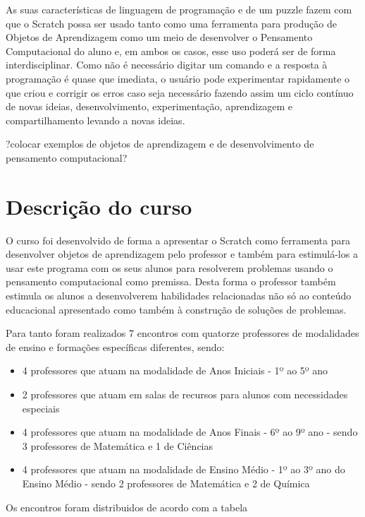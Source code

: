 \documentclass[12pt, openright, a4paper, brazil, english, french, spanish, bibjustif, openany, oneside]{abntex2}
\begin{document}
 As suas características de linguagem de programação e de um puzzle fazem com que o Scratch possa ser usado tanto como uma ferramenta para produção de Objetos de Aprendizagem como um meio de desenvolver o Pensamento Computacional do aluno e, em ambos os casos, esse uso poderá ser de forma interdisciplinar. Como não é necessário digitar um comando e a resposta à programação é quase que imediata, o usuário pode experimentar rapidamente o que criou e corrigir os erros caso seja necessário fazendo assim um ciclo contínuo de novas ideias, desenvolvimento, experimentação, aprendizagem e compartilhamento levando a novas ideias. 

?colocar exemplos de objetos de aprendizagem e de desenvolvimento de pensamento computacional?

\chapter{Descrição do curso}

O curso foi desenvolvido de forma a apresentar o Scratch como ferramenta para desenvolver objetos de aprendizagem pelo professor e também para estimulá-los a usar este programa com os seus alunos para resolverem problemas usando o pensamento computacional como premissa. Desta forma o professor também estimula os alunos a desenvolverem habilidades relacionadas não só ao conteúdo educacional apresentado como também à construção de soluções de problemas. 

Para tanto foram realizados 7 encontros com quatorze professores de modalidades de ensino e formações específicas diferentes, sendo:

\begin{itemize}

\item 4 professores que atuam na modalidade de Anos Iniciais - 1º ao 5º ano
\item 2 professores que atuam em salas de recursos para alunos com necessidades especiais
\item 4 professores que atuam na modalidade de Anos Finais - 6º ao 9º ano - sendo 3 professores de Matemática e 1 de Ciências
\item 4 professores que atuam na modalidade de Ensino Médio - 1º ao 3º ano do Ensino Médio - sendo 2 professores de Matemática e 2 de Química

\end{itemize}


Os encontros foram distribuidos de acordo com a tabela 
\end{document}
